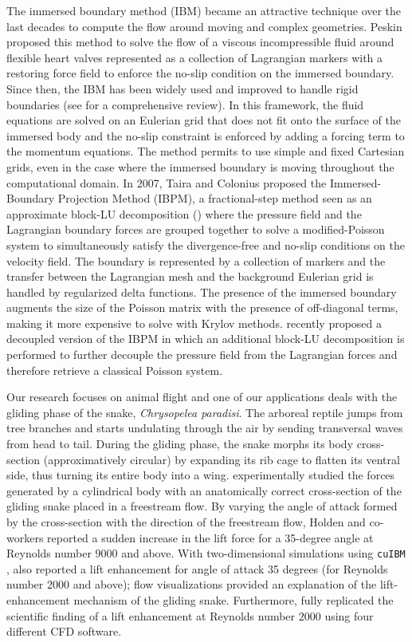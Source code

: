 \documentclass[12pt]{article}
\newcommand{\cuibm}{\texttt{cuIBM} }
\begin{document}
The immersed boundary method (IBM) became an attractive technique over the last decades to compute the flow around moving and complex geometries.
Peskin\cite{Peskin_1972} proposed this method to solve the flow of a viscous incompressible fluid around flexible heart valves represented as a collection of Lagrangian markers with a restoring force field to enforce the no-slip condition on the immersed boundary.
Since then, the IBM has been widely used and improved to handle rigid boundaries (see \cite{Mittal_Iaccarino_2005} for a comprehensive review).
In this framework, the fluid equations are solved on an Eulerian grid that does not fit onto the surface of the immersed body and the no-slip constraint is enforced by adding a forcing term to the momentum equations.
The method permits to use simple and fixed Cartesian grids, even in the case where the immersed boundary is moving throughout the computational domain.
In 2007, Taira and Colonius\cite{Taira_Colonius_2007} proposed the Immersed-Boundary Projection Method (IBPM), a fractional-step method seen as an approximate block-LU decomposition (\cite{Perot_1993}) where the pressure field and the Lagrangian boundary forces are grouped together to solve a modified-Poisson system to simultaneously satisfy the divergence-free and no-slip conditions on the velocity field.
The boundary is represented by a collection of markers and the transfer between the Lagrangian mesh and the background Eulerian grid is handled by regularized delta functions.
The presence of the immersed boundary augments the size of the Poisson matrix with the presence of off-diagonal terms, making it more expensive to solve with Krylov methods.
\cite{Li_et_al_2016} recently proposed a decoupled version of the IBPM in which an additional block-LU decomposition is performed to further decouple the pressure field from the Lagrangian forces and therefore retrieve a classical Poisson system.

Our research focuses on animal flight and one of our applications deals with the gliding phase of the snake, \textit{Chrysopelea paradisi}\cite{Socha_2011}.
The arboreal reptile jumps from tree branches and starts undulating through the air by sending transversal waves from head to tail.
During the gliding phase, the snake morphs its body cross-section (approximatively circular) by expanding its rib cage to flatten its ventral side, thus turning its entire body into a wing.
\cite{Holden_et_al_2014} experimentally studied the forces generated by a cylindrical body with an anatomically correct cross-section of the gliding snake placed in a freestream flow.
By varying the angle of attack formed by the cross-section with the direction of the freestream flow, Holden and co-workers reported a sudden increase in the lift force for a 35-degree angle at Reynolds number $9000$ and above.
With two-dimensional simulations using \cuibm, \cite{Krishnan_et_al_2014} also reported a lift enhancement for angle of attack 35 degrees (for Reynolds number $2000$ and above); flow visualizations provided an explanation of the lift-enhancement mechanism of the gliding snake.
Furthermore, \cite{Mesnard_Barba_2017} fully replicated the scientific finding of a lift enhancement at Reynolds number $2000$ using four different CFD software.
\end{document}
